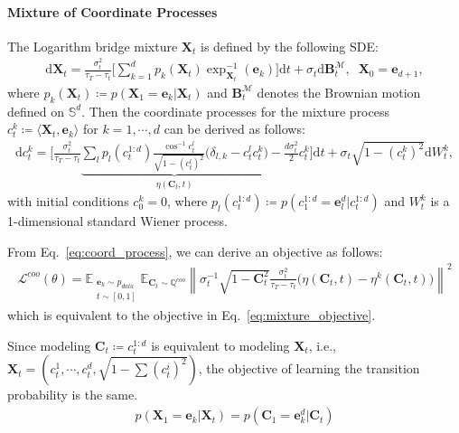 \paragraph{Mixture of Coordinate Processes}
The Logarithm bridge mixture $\bm{X}_t$ is defined by the following SDE:
\begin{align}
    \mathrm{d}\bm{X}_t = 
   \frac{\sigma_t^2}{\tau_T-\tau_t} \Bigg[ 
    \sum^d_{k=1} p_k(\bm{X}_t) \exp^{-1}_{\!\bm{X}_t}\!(\bm{e}_k)
    \Bigg]
    \mathrm{d}t + \sigma_t\mathrm{d}\mathbf{B}^{\mathcal{M}}_t, \;\; \bm{X}_0=\bm{e}_{d+1} ,
\end{align}
where $p_k(\bm{X}_t)\coloneqq p(\bm{X}_1=\bm{e}_k|\bm{X}_t)$ and $\mathbf{B}^{\mathcal{M}}_t$ denotes the Brownian motion defined on $\mathbb{S}^d$.
Then the coordinate processes for the mixture process $c^k_t\coloneqq \langle\bm{X}_t, \bm{e}_k \rangle$ for $k=1,\cdots,d$ can be derived as follows:
\begin{align}
    \mathrm{d}c^{k}_t = \Bigg[ 
        \frac{\sigma_t^2}{\tau_T - \tau_t} 
        \underbrace{\sum_l p_l(c^{1:d}_t) \frac{\cos^{-1}c^{l}_t}{\sqrt{1 - (c^{l}_t)^2}} \bigg( \delta_{l,k} - c^{l}_t c^{k}_t \bigg)}_{\eta(\bm{C}_t, t)}
        -\frac{d\sigma_t^2}{2}c^{k}_t
    \Bigg] \mathrm{d}t 
    + \sigma_t\sqrt{1 - (c^{k}_t)^2}\mathrm{d}W^k_t,
\end{align}
with initial conditions $c^k_0=0$, where $p_l(c^{1:d}_t) \coloneqq p(c^{1:d}_1=\bm{e}^{d}_l|c^{1:d}_t)$ and $W^k_t$ is a 1-dimensional standard Wiener process.

From Eq.~\eqref{eq:coord_process}, we can derive an objective as follows:
\begin{align}
    \mathcal{L}^{coo}(\theta) 
    = \mathbb{E}_{\substack{\bm{e}_k\sim p_{data} \\ t\sim [0,1]}}\mathbb{E}_{\bm{C}_t\sim\mathbb{Q}^{coo}}\left\| \sigma_t^{-1}\sqrt{1-\bm{C}^2_t}
    \frac{\sigma_t^2}{\tau_T-\tau_t}\bigg( 
        \eta(\bm{C}_t,t) - \eta^k(\bm{C}_t,t)
    \bigg) \right\|^2
\end{align}
which is equivalent to the objective in Eq.~\eqref{eq:mixture_objective}.


Since modeling $\bm{C}_t\coloneqq c^{1:d}_t$ is equivalent to modeling $\bm{X}_t$, i.e., $\bm{X}_t = \left(c^1_t,\cdots,c^d_t,\sqrt{1 - \sum (c^i_t)^2}\right)$, the objective of learning the transition probability is the same.
\begin{align}
    p(\bm{X}_1=\bm{e}_k|\bm{X}_t) = p(\bm{C}_1=\bm{e}^d_k|\bm{C}_t)
\end{align}


